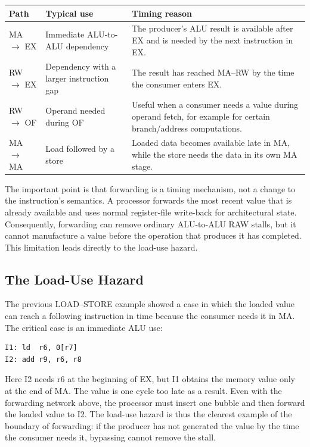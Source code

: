 \documentclass[12pt,a4paper]{report}
\begin{document}
\begin{center}
\begin{tabular}{@{}L{2.6cm}L{4.6cm}L{6.4cm}@{}}
\toprule
Path & Typical use & Timing reason \\
\midrule
MA $\to$ EX & Immediate ALU-to-ALU dependency & The producer's ALU result is available after EX and is needed by the next instruction in EX. \\
RW $\to$ EX & Dependency with a larger instruction gap & The result has reached MA--RW by the time the consumer enters EX. \\
RW $\to$ OF & Operand needed during OF & Useful when a consumer needs a value during operand fetch, for example for certain branch/address computations. \\
MA $\to$ MA & Load followed by a store & Loaded data becomes available late in MA, while the store needs the data in its own MA stage. \\
\bottomrule
\end{tabular}
\end{center}

The important point is that forwarding is a timing mechanism, not a change to the instruction's semantics. A processor forwards the most recent value that is already available and uses normal register-file write-back for architectural state. Consequently, forwarding can remove ordinary ALU-to-ALU RAW stalls, but it cannot manufacture a value before the operation that produces it has completed. This limitation leads directly to the load-use hazard.

\subsection{The Load-Use Hazard}

The previous LOAD--STORE example showed a case in which the loaded value can reach a following instruction in time because the consumer needs it in MA. The critical case is an immediate ALU use:

\begin{lstlisting}[caption={A load-use hazard: I2 consumes I1's loaded value one cycle too early},label={lst:load-use}]
I1: ld  r6, 0[r7]
I2: add r9, r6, r8
\end{lstlisting}

Here I2 needs r6 at the beginning of EX, but I1 obtains the memory value only at the end of MA. The value is one cycle too late as a result. Even with the forwarding network above, the processor must insert one bubble and then forward the loaded value to I2. The load-use hazard is thus the clearest example of the boundary of forwarding: if the producer has not generated the value by the time the consumer needs it, bypassing cannot remove the stall.~\cite{hennessy}
\end{document}
